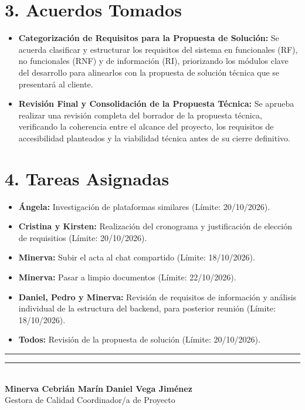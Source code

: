\section*{3. Acuerdos Tomados}

\begin{itemize}
    \item \textbf{Categorización de Requisitos para la Propuesta de Solución:} 
    Se acuerda clasificar y estructurar los requisitos del sistema en funcionales (RF), no funcionales (RNF) y de información (RI), priorizando los módulos clave del desarrollo para alinearlos con la propuesta de solución técnica que se presentará al cliente.

    \item \textbf{Revisión Final y Consolidación de la Propuesta Técnica:} 
    Se aprueba realizar una revisión completa del borrador de la propuesta técnica, verificando la coherencia entre el alcance del proyecto, los requisitos de accesibilidad planteados y la viabilidad técnica antes de su cierre definitivo.
\end{itemize}

\section*{4. Tareas Asignadas}
\begin{itemize}
    \item \textbf{Ángela:} Investigación de plataformas similares (Límite: 20/10/2026).
     \item \textbf{Cristina y Kirsten:} Realización del cronograma y justificación de elección de requisitios (Límite: 20/10/2026).
    \item \textbf{Minerva:} Subir el acta al chat compartido (Límite: 18/10/2026).
    \item \textbf{Minerva:} Pasar a limpio documentos (Límite: 22/10/2026).
     \item \textbf{Daniel, Pedro y Minerva:} Revisión de requisitos de información y análisis individual de la estructura del backend, para posterior reunión (Límite: 18/10/2026).
    \item \textbf{Todos:} Revisión de la propuesta de solución (Límite: 20/10/2026).
\end{itemize}

\noindent
\rule{6cm}{0.4pt} \hfill \rule{6cm}{0.4pt}\\
\textbf{Minerva Cebrián Marín} \hfill \textbf{Daniel Vega Jiménez}\\
Gestora de Calidad \hfill Coordinador/a de Proyecto
